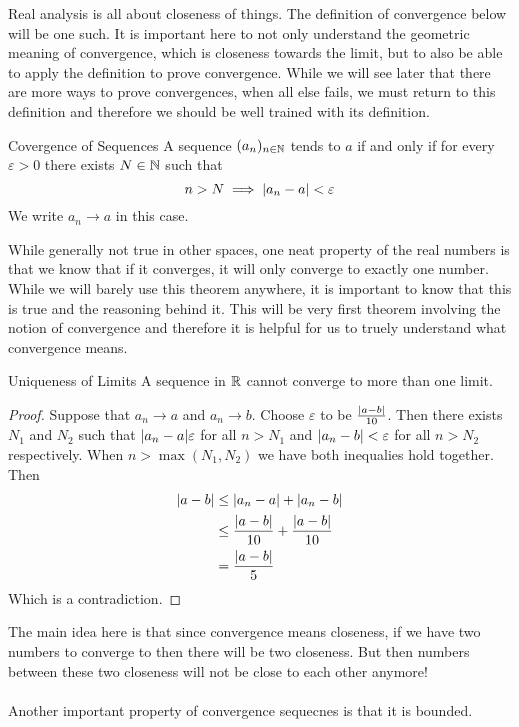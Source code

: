 \documentclass[a4paper]{article}
\begin{document}
Real analysis is all about closeness of things. The definition of convergence below will be one such. It is important here to not only understand the geometric meaning of convergence, which is closeness towards the limit, but to also be able to apply the definition to prove convergence. While we will see later that there are more ways to prove convergences, when all else fails, we must return to this definition and therefore we should be well trained with its definition. 

\begin{defn}{Covergence of Sequences}{} A sequence $(a_n)_{n\in\mathbb{N}}$ tends to $a$ if and only if for every $\varepsilon>0$ there exists $N\in\mathbb{N}$ such that $$n>N\implies \abs{a_n-a}<\varepsilon$$
We write $a_n\to a$ in this case. 
\end{defn}

While generally not true in other spaces, one neat property of the real numbers is that we know that if it converges, it will only converge to exactly one number. While we will barely use this theorem anywhere, it is important to know that this is true and the reasoning behind it. This will be very first theorem involving the notion of convergence and therefore it is helpful for us to truely understand what convergence means. 

\begin{prp}{Uniqueness of Limits}{} A sequence in $\mathbb{R}$ cannot converge to more than one limit. \tcbline
\begin{proof} Suppose that $a_n\to a$ and $a_n\to b$. Choose $\varepsilon$ to be $\frac{\abs{a-b}}{10}$. Then there exists $N_1$ and $N_2$ such that $\abs{a_n-a}\varepsilon$ for all $n>N_1$ and $\abs{a_n-b}<\varepsilon$ for all $n>N_2$ respectively. When $n>\max{(N_1,N_2)}$ we have both inequalies hold together. Then 
\begin{align*}
\abs{a-b}&\leq\abs{a_n-a}+\abs{a_n-b}\\
&\leq \frac{\abs{a-b}}{10}+\frac{\abs{a-b}}{10}\\
&=\frac{\abs{a-b}}{5}
\end{align*}
Which is a contradiction. 
\end{proof}
\end{prp}

The main idea here is that since convergence means closeness, if we have two numbers to converge to then there will be two closeness. But then numbers between these two closeness will not be close to each other anymore! \\~\\
Another important property of convergence sequecnes is that it is bounded. 
\end{document}
